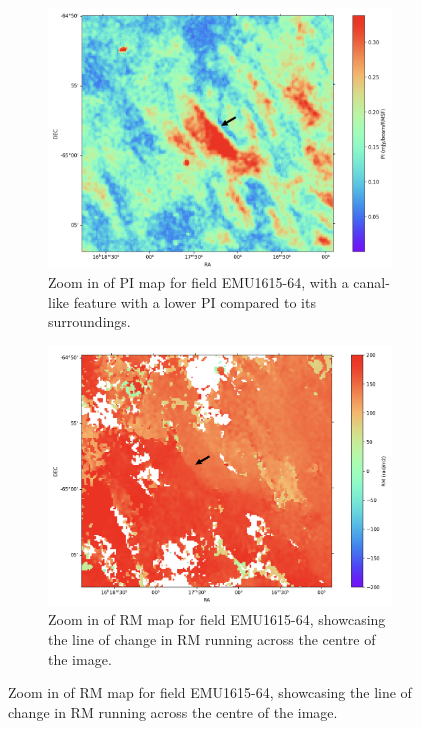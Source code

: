 \begin{figure}
    \centering
    \begin{subfigure}[b]{0.6\textwidth}
        \includegraphics[width=\linewidth]{Thesis_Template/Figures/1615_pi_zoom_corr.png}
        \caption{Zoom in of PI map for field EMU1615-64, with a canal-like feature with a lower PI compared to its surroundings.}
        \label{fig: 1615 pi zoom}
    \end{subfigure}
    \begin{subfigure}[b]{0.6\textwidth}
        \includegraphics[width=\linewidth]{Thesis_Template/Figures/1615_RM_zoom_corr.png}
        \caption{Zoom in of RM map for field EMU1615-64, showcasing the line of change in RM running across the centre of the image.}

\end{subfigure}
\end{figure}
